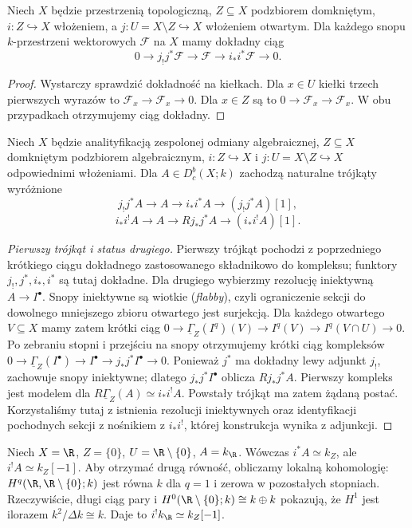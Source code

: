 \begin{lemat}
Niech $X$ będzie przestrzenią topologiczną,
$Z\subseteq X$ podzbiorem domkniętym,
$i:Z\hookrightarrow X$ włożeniem,
a $j:U=X\setminus Z\hookrightarrow X$ włożeniem otwartym.
Dla każdego snopu $k$-przestrzeni wektorowych
$\mathcal F$ na $X$ mamy dokładny ciąg
\[
0\longrightarrow j_!j^*\mathcal F
\longrightarrow\mathcal F\longrightarrow i_*i^*\mathcal F
\longrightarrow0.
\]
\end{lemat}
\begin{proof}
Wystarczy sprawdzić dokładność na kiełkach.
Dla $x\in U$ kiełki trzech pierwszych wyrazów to
$\mathcal F_x\to\mathcal F_x\to0$.
Dla $x\in Z$ są to $0\to\mathcal F_x\to\mathcal F_x$.
W obu przypadkach otrzymujemy ciąg dokładny.
\end{proof}
\begin{twierdzenie}
\label{thm:xvi-localization}
Niech $X$ będzie analityfikacją zespolonej
odmiany algebraicznej, $Z\subseteq X$ domkniętym
podzbiorem algebraicznym,
$i:Z\hookrightarrow X$ i $j:U=X\setminus Z\hookrightarrow X$
odpowiednimi włożeniami.
Dla $A\in D^b_c(X;k)$ zachodzą naturalne trójkąty wyróżnione
\[
 j_!j^*A\to A\to i_*i^*A\to (j_!j^*A)[1],
\]
\[
 i_*i^!A\to A\to Rj_*j^*A\to (i_*i^!A)[1].
\]
\end{twierdzenie}
\begin{proof}[Pierwszy trójkąt i status drugiego]
Pierwszy trójkąt pochodzi z poprzedniego krótkiego ciągu dokładnego
zastosowanego składnikowo do kompleksu; funktory $j_!,j^*,i_*,i^*$
są tutaj dokładne. Dla drugiego wybierzmy rezolucję
iniektywną $A\to I^\bullet$. Snopy iniektywne są wiotkie
(\emph{flabby}), czyli ograniczenie sekcji do dowolnego
mniejszego zbioru otwartego jest surjekcją.
Dla każdego otwartego $V\subseteq X$ mamy zatem krótki ciąg
$0\to\underline\Gamma_Z(I^q)(V)
\to I^q(V)\to I^q(V\cap U)\to0$.
Po zebraniu stopni i przejściu na snopy otrzymujemy
krótki ciąg kompleksów
$0\to\underline\Gamma_Z(I^\bullet)
\to I^\bullet\to j_*j^*I^\bullet\to0$.
Ponieważ $j^*$ ma dokładny lewy adjunkt $j_!$,
zachowuje snopy iniektywne; dlatego
$j_*j^*I^\bullet$ oblicza $Rj_*j^*A$.
Pierwszy kompleks jest modelem dla
$R\underline\Gamma_Z(A)\simeq i_*i^!A$.
Powstały trójkąt ma zatem żądaną postać.
Korzystaliśmy tutaj z istnienia rezolucji iniektywnych
oraz identyfikacji pochodnych sekcji z nośnikiem
z $i_*i^!$, której konstrukcja wynika z adjunkcji.
\end{proof}
\begin{przyklad}
\label{ex:xvi-point-line}
Niech $X=\R$, $Z=\{0\}$, $U=\R\setminus\{0\}$,
$A=k_{\R}$. Wówczas $i^*A\simeq k_Z$, ale
$i^!A\simeq k_Z[-1]$. Aby otrzymać drugą równość,
obliczamy lokalną kohomologię:
$H^q(\R,\R\setminus\{0\};k)$ jest równa $k$ dla $q=1$
i zerowa w pozostałych stopniach. Rzeczywiście, długi ciąg
pary i $H^0(\R\setminus\{0\};k)\cong k\oplus k$
pokazują, że $H^1$ jest ilorazem $k^2/\Delta k\cong k$.
Daje to $i^!k_{\R}\simeq k_Z[-1]$.
\end{przyklad}
